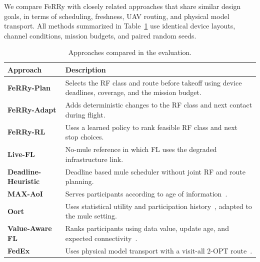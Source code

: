 \documentclass[conference]{IEEEtran}
\newcommand{\sysname}{FeRRy}
\begin{document}

We compare \sysname{} with closely related approaches that share similar design goals, in terms of scheduling, freshness, UAV routing, and physical
model transport. All methods summarized in Table~\ref{tab:arms} use identical device layouts, channel conditions,
mission budgets, and paired random seeds.


\begin{table}[t]
\centering
\caption{Approaches compared in the evaluation.}
\label{tab:arms}
\small
\begin{tabular}{p{} p{}}
\hline
\textbf{Approach} & \textbf{Description} \\
\hline

\textbf{\sysname{}-Plan} &
Selects the RF class and route before takeoff using device deadlines, coverage,
and the mission budget. \\

\textbf{\sysname{}-Adapt} &
Adds deterministic changes to the RF class and next contact during flight. \\

\textbf{\sysname{}-RL} &
Uses a learned policy to rank feasible RF class and next stop choices. \\

\textbf{Live-FL} &
No-mule reference in which FL uses the degraded infrastructure link. \\

\textbf{Deadline-Heuristic} &
Deadline based mule scheduler without joint RF and route planning. \\

\textbf{MAX-AoI} &
Serves participants according to age of information~\cite{kadota2018scheduling}. \\

\textbf{Oort} &
Uses statistical utility and participation history~\cite{lai2021oort},
adapted to the mule setting. \\

\textbf{Value-Aware FL} &
Ranks participants using data value, update age, and expected
connectivity~\cite{cui2023data}. \\

\textbf{FedEx} &
Uses physical model transport with a visit-all 2-OPT
route~\cite{bian2025indirect}. \\


\end{tabular}
\end{table}
\end{document}
